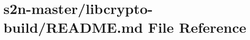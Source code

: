 \hypertarget{libcrypto-build_2_r_e_a_d_m_e_8md}{}\section{s2n-\/master/libcrypto-\/build/\+R\+E\+A\+D\+ME.md File Reference}
\label{libcrypto-build_2_r_e_a_d_m_e_8md}
